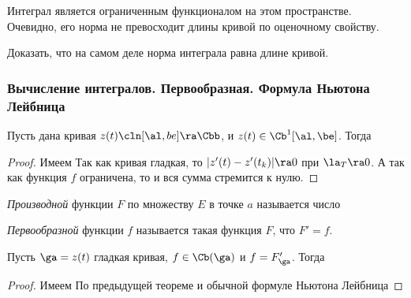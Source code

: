 \documentclass[a4paper]{article}
\begin{document}
\begin{solution}
Интеграл является ограниченным функционалом на этом пространстве. Очевидно, его норма не превосходит длины
кривой по оценочному свойству.

\begin{problem}
Доказать, что на самом деле норма интеграла равна длине кривой.
\end{problem}

\subsubsection{Вычисление интегралов. Первообразная. Формула Ньютона Лейбница}

\begin{theorem}
Пусть дана кривая $z(t)\cln[\al,be]\ra\Cbb$, и $z(t)\in\Cb^1[\al,\be]$. Тогда
\end{theorem}
\begin{proof}
Имеем
Так как кривая гладкая, то $|z'(t)-z'(t_k)|\ra 0$ при $\la_T\ra 0$. А так как функция $f$ ограничена, то и вся сумма стремится к нулю.
\end{proof}

\begin{df}
\emph{Производной} функции $F$ по множеству $E$ в точке $a$ называется число
\end{df}

\begin{df}
\emph{Первообразной} функции $f$ называется такая функция $F$, что $F' =f$.
\end{df}

\begin{theorem}
Пусть $\ga=z(t)$ гладкая кривая, $f\in\Cb(\ga)$ и $f = F'_\ga$. Тогда
\end{theorem}
\begin{proof}
Имеем
По предыдущей теореме и обычной формуле Ньютона Лейбница
\hfill\end{proof}




\end{solution}
\end{document}

